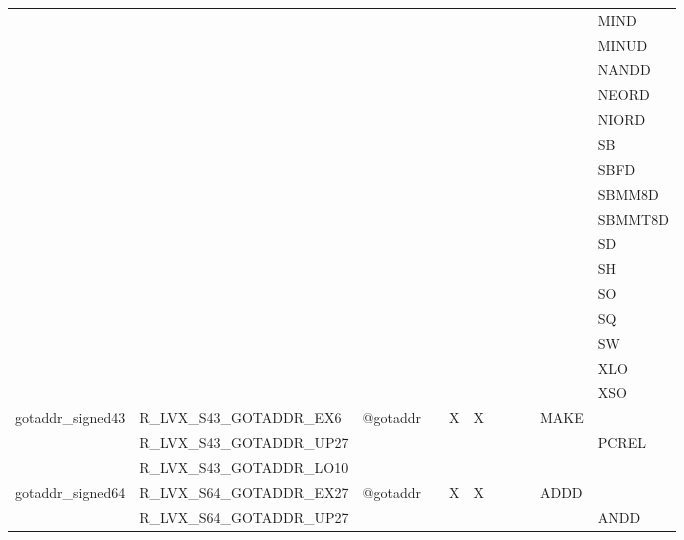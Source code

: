 {\begin{tabular}{|l|l|l|l|l|l|l|l|l|l|l|}
 & & & & & & & & & & \textsf{MIND} \\
 & & & & & & & & & & \textsf{MINUD} \\
 & & & & & & & & & & \textsf{NANDD} \\
 & & & & & & & & & & \textsf{NEORD} \\
 & & & & & & & & & & \textsf{NIORD} \\
 & & & & & & & & & & \textsf{SB} \\
 & & & & & & & & & & \textsf{SBFD} \\
 & & & & & & & & & & \textsf{SBMM8D} \\
 & & & & & & & & & & \textsf{SBMMT8D} \\
 & & & & & & & & & & \textsf{SD} \\
 & & & & & & & & & & \textsf{SH} \\
 & & & & & & & & & & \textsf{SO} \\
 & & & & & & & & & & \textsf{SQ} \\
 & & & & & & & & & & \textsf{SW} \\
 & & & & & & & & & & \textsf{XLO} \\
 & & & & & & & & & & \textsf{XSO} \\
\hline
\textsf{gotaddr\_signed43} & \textsf{R\_LVX\_S43\_GOTADDR\_EX6} & \textsf{@gotaddr} & \textsf{} & \textsf{X} & \textsf{X} & \textsf{} & \textsf{} & \textsf{} & \textsf{MAKE} \\
 & \textsf{R\_LVX\_S43\_GOTADDR\_UP27} & & & & & & & & & \textsf{PCREL} \\
 & \textsf{R\_LVX\_S43\_GOTADDR\_LO10} & & & & & & & & & \\
\hline
\textsf{gotaddr\_signed64} & \textsf{R\_LVX\_S64\_GOTADDR\_EX27} & \textsf{@gotaddr} & \textsf{} & \textsf{X} & \textsf{X} & \textsf{} & \textsf{} & \textsf{} & \textsf{ADDD} \\
 & \textsf{R\_LVX\_S64\_GOTADDR\_UP27} & & & & & & & & & \textsf{ANDD} \\
\hline\end{tabular}
}
\smallskip

